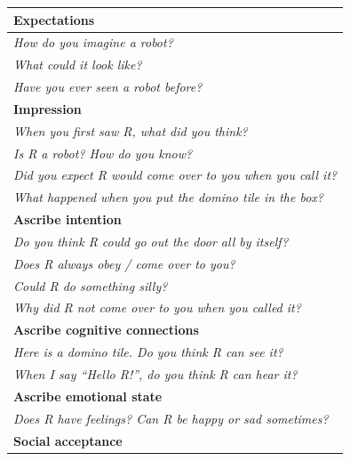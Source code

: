 \documentclass[letterpaper, 10pt, conference]{ieeeconf}
\begin{document}
\begin{table}[h!t]
\centering
\footnotesize
\begin{tabular}{p{1\linewidth}}
    \toprule
    \textbf{Expectations} \\
    \midrule

    \emph{How do you imagine a robot?} \\
    \emph{What could it look like?} \\
    \emph{Have you ever seen a robot before?} \\

    \toprule
    \textbf{Impression} \\
    \midrule


    \emph{When you first saw R, what did you think?} \\
    \emph{Is R a robot? How do you know?} \\
    \emph{Did you expect R would come over to you when you call it?} \\
    \emph{What happened when you put the domino tile in the box?} \\

    \toprule
    \textbf{Ascribe intention} \\
    \midrule


    \emph{Do you think R could go out the door all by itself?} \\	
    \emph{Does R always obey / come over to you?} \\
    \emph{Could R do something silly?} \\
    \emph{Why did R not come over to you when you called it?} \\

    \toprule
    \textbf{Ascribe cognitive connections} \\
    \midrule


    \emph{Here is a domino tile. Do you think R can see it?} \\ 
    \emph{When I say \textit{``Hello R!''}, do you think R can hear it?} \\

    \toprule
    \textbf{Ascribe emotional state} \\
    \midrule


    \emph{Does R have feelings? Can R be happy or sad sometimes?} \\

    \toprule
    \textbf{Social acceptance} \\
    \midrule



\end{tabular}
\end{table}
\end{document}
